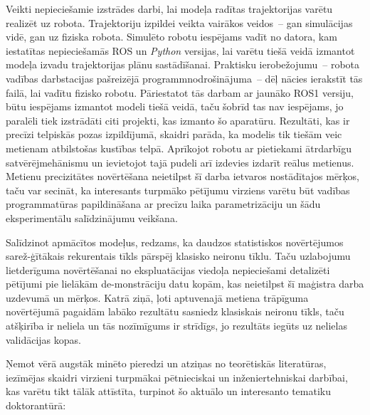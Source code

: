 \documentclass[12pt, a4paper]{article}
\numberwithin{equation}{section} %
\begin{document}
Veikti nepieciešamie izstrādes darbi, lai modeļa radītas trajektorijas varētu realizēt uz robota. Trajektoriju izpildei veikta vairākos veidos~-- gan simulācijas vidē, gan uz fiziska robota. Simulēto robotu iespējams vadīt no datora, kam iestatītas nepieciešamās ROS un \textit{Python} versijas, lai varētu tiešā veidā izmantot modeļa izvadu trajektorijas plānu sastādīšanai. Praktisku ierobežojumu~-- robota vadības darbstacijas pašreizējā programmnodrošinājuma~-- dēļ nācies ierakstīt tās failā, lai vadītu fizisko robotu. Pāriestatot tās darbam ar jaunāko ROS1 versiju, būtu iespējams izmantot modeli tiešā veidā, taču šobrīd tas nav iespējams, jo paralēli tiek izstrādāti citi projekti, kas izmanto šo aparatūru. Rezultāti, kas ir precīzi telpiskās pozas izpildījumā, skaidri parāda, ka modelis tik tiešām veic metienam atbilstošas kustības telpā. Aprīkojot robotu ar pietiekami ātrdarbīgu satvērējmehānismu un ievietojot tajā pudeli arī izdevies izdarīt reālus metienus. Metienu precizitātes novērtēšana neietilpst šī darba ietvaros nostādītajos mērķos, taču var secināt, ka interesants turpmāko pētījumu virziens varētu būt vadības programmatūras papildināšana ar precīzu laika parametrizāciju un šādu eksperimentālu salīdzinājumu veikšana.

Salīdzinot apmācītos modeļus, redzams, ka daudzos statistiskos novērtējumos sarež-ģītākais rekurentais tīkls pārspēj klasisko neironu tīklu. Taču uzlabojumu lietderīguma novērtēšanai no ekspluatācijas viedoļa nepieciešami detalizēti pētījumi pie lielākām de-monstrāciju datu kopām, kas neietilpst šī maģistra darba uzdevumā un mērķos. Katrā ziņā, ļoti aptuvenajā metiena trāpīguma novērtējumā pagaidām labāko rezultātu sasniedz klasiskais neironu tīkls, taču atšķirība ir neliela un tās nozīmīgums ir strīdīgs, jo rezultāts iegūts uz nelielas validācijas kopas.

Ņemot vērā augstāk minēto pieredzi un atziņas no teorētiskās literatūras, iezīmējas skaidri virzieni turpmākai pētnieciskai un inženiertehniskai darbībai, kas varētu tikt tālāk attīstīta, turpinot šo aktuālo un interesanto tematiku doktorantūrā:
\end{document}

